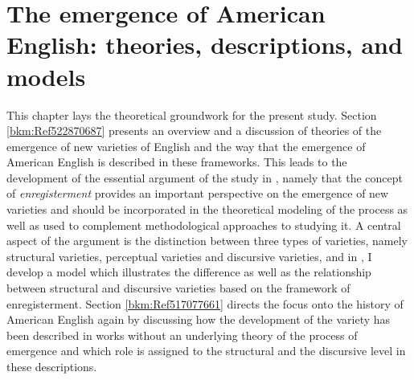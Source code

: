 \chapter{The emergence of American English: theories, descriptions, and models}
\label{bkm:Ref523475305}\hypertarget{Toc63021204}{}
This chapter lays the theoretical groundwork for the present study. Section \ref{bkm:Ref522870687} presents an overview and a discussion of theories of the emergence of new varieties of English and the way that the emergence of American English is described in these frameworks. This leads to the development of the essential argument of the study in , namely that the concept of \textit{enregisterment} provides an important perspective on the emergence of new varieties and should be incorporated in the theoretical modeling of the process as well as used to complement methodological approaches to studying it. A central aspect of the argument is the distinction between three types of varieties, namely structural varieties, perceptual varieties and discursive varieties, and in , I develop a model which illustrates the difference as well as the relationship between structural and discursive varieties based on the framework of enregisterment. Section \ref{bkm:Ref517077661} directs the focus onto the history of American English again by discussing how the development of the variety has been described in works without an underlying theory of the process of emergence and which role is assigned to the structural and the discursive level in these descriptions.


